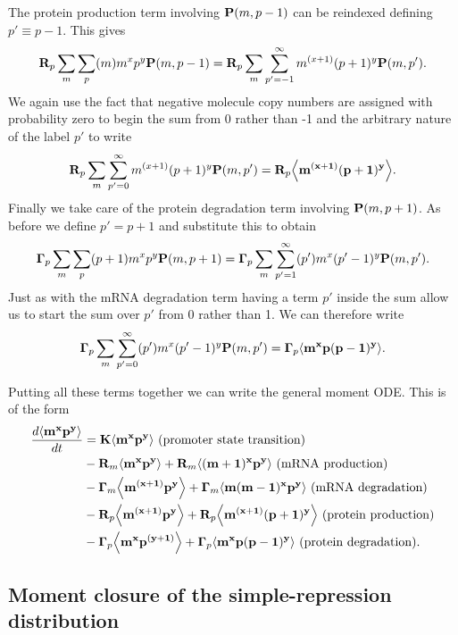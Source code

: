 The protein production term involving $\mathbf{P}(m, p - 1)$ can be reindexed defining
$p' \equiv p - 1$. This gives
\begin{equation}
  \mathbf{R}_p \sum_m \sum_p (m) m^x p^y \mathbf{P}(m, p - 1) =
  \mathbf{R}_p \sum_m \sum_{p'=-1}^\infty m^{(x + 1)} (p + 1)^y \mathbf{P}(m, p').
\end{equation}
We again use the fact that negative molecule copy numbers are assigned with
probability zero to begin the sum from 0 rather than -1 and the arbitrary nature
of the label $p'$ to write
\begin{equation}
  \mathbf{R}_p \sum_m \sum_{p'=0}^\infty m^{(x + 1)} (p + 1)^y \mathbf{P}(m, p') =
  \mathbf{R}_p \mathbf{\left\langle m^{(x + 1)} (p + 1)^y \right\rangle}.
\end{equation}
Finally we take care of the protein degradation term involving $\mathbf{P}(m, p + 1)$.
As before we define $p' = p + 1$ and substitute this to obtain
\begin{equation}
  \mathbf{\Gamma}_p \sum_m \sum_p (p + 1) m^x p^y \mathbf{P}(m, p + 1) =
  \mathbf{\Gamma}_p \sum_m \sum_{p'=1}^\infty (p') m^x (p' - 1)^y \mathbf{P}(m, p').
\end{equation}
Just as with the mRNA degradation term having a term $p'$  inside the sum allow
us to start the sum over $p'$ from 0 rather than 1. We can therefore write
\begin{equation}
  \mathbf{\Gamma}_p \sum_m \sum_{p'=0}^\infty (p') m^x (p' - 1)^y \mathbf{P}(m, p') =
  \mathbf{\Gamma}_p \mathbf{\left\langle m^x p (p - 1)^y \right\rangle}.
\end{equation}

Putting all these terms together we can write the general moment ODE. This is
of the form
\begin{equation}
  \begin{aligned}
    {d{\mathbf{\left\langle m^x p^y \right\rangle}} \over dt} &=
    \mathbf{K} \mathbf{\left\langle m^x p^y \right\rangle}
    \text{  (promoter state transition)}\\
    &- \mathbf{R}_m \mathbf{\left\langle m^x p^y \right\rangle} + \mathbf{R}_m \mathbf{\left\langle (m+1)^x p^y \right\rangle}
    \text{  (mRNA production)}\\
    &- \mathbf{\Gamma}_m \mathbf{\left\langle m^{(x + 1)} p^y \right\rangle} + \mathbf{\Gamma}_m \mathbf{\left\langle m (m - 1)^x p^y \right\rangle}
    \text{  (mRNA degradation)}\\
    &- \mathbf{R}_p \mathbf{\left\langle m^{(x + 1)} p^y \right\rangle} + \mathbf{R}_p \mathbf{\left\langle m^{(x + 1)} (p + 1)^y \right\rangle}
    \text{  (protein production)}\\
    &- \mathbf{\Gamma}_p \mathbf{\left\langle m^x p^{(y + 1)} \right\rangle} + \mathbf{\Gamma}_p \mathbf{\left\langle m^x p (p - 1)^y \right\rangle}
    \text{  (protein degradation)}.
  \end{aligned}
  \label{seq_mom_ode}
\end{equation}

\subsection{Moment closure of the simple-repression distribution}

